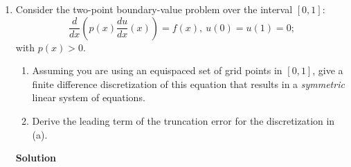 \documentclass{article}
\begin{document}
\begin{enumerate}
{\bf Solution}

\begin{enumerate}
\item The expected rate of convergence for the composite trapezoidal method is second-order (i.e., the error is \(O(h^2)\)).

\item The errors in computation (a) seem to be \(O(h^{1 + \epsilon})\) for some relatively small \(\epsilon > 0\); the errors for computation (b) seem to be \(O(h^2)\).

\item For computation (a), the integrand fails to be differentiable at \(t = 0\), which would explain the less-than-expected rate of convergence.

\end{enumerate}



\item Consider the two-point boundary-value problem over the interval \([0,1]\):
\[\frac{d}{dx} \left( p(x) \frac{du}{dx}(x) \right) = f(x), \ u(0) = u(1) = 0;\]
with \(p(x) > 0\).

\begin{enumerate}
\item Assuming you are using an equispaced set of grid points in \([0,1]\), give a finite difference discretization of this equation that results in a {\em symmetric} linear system of equations.

\item Derive the leading term of the truncation error for the discretization in (a).

\end{enumerate}

{\bf Solution}


\end{enumerate}
\end{document}
